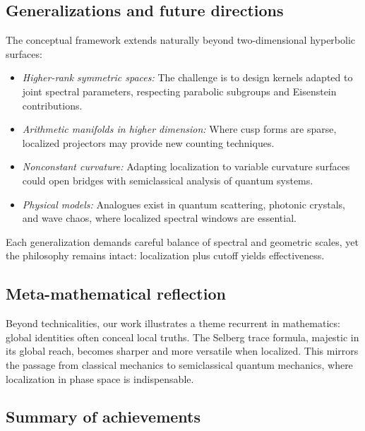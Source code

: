 \subsection*{Generalizations and future directions}

The conceptual framework extends naturally beyond two-dimensional hyperbolic surfaces:
\begin{itemize}
\item \emph{Higher-rank symmetric spaces:} The challenge is to design kernels adapted to joint spectral parameters, respecting parabolic subgroups and Eisenstein contributions.
\item \emph{Arithmetic manifolds in higher dimension:} Where cusp forms are sparse, localized projectors may provide new counting techniques.
\item \emph{Nonconstant curvature:} Adapting localization to variable curvature surfaces could open bridges with semiclassical analysis of quantum systems.
\item \emph{Physical models:} Analogues exist in quantum scattering, photonic crystals, and wave chaos, where localized spectral windows are essential.
\end{itemize}

Each generalization demands careful balance of spectral and geometric scales, yet the philosophy remains intact: localization plus cutoff yields effectiveness.

\subsection*{Meta-mathematical reflection}

Beyond technicalities, our work illustrates a theme recurrent in mathematics: global identities often conceal local truths. The Selberg trace formula, majestic in its global reach, becomes sharper and more versatile when localized. This mirrors the passage from classical mechanics to semiclassical quantum mechanics, where localization in phase space is indispensable.

\subsection*{Summary of achievements}

